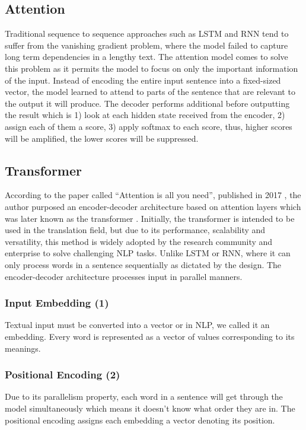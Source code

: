 \documentclass[12pt,oneside,openright,a4paper]{cpe-english-project}
\begin{document}
\subsection{Attention}
Traditional sequence to sequence approaches such as LSTM and RNN tend to suffer from the vanishing gradient problem, where the model failed to capture long term dependencies in a lengthy text. The attention model comes to solve this problem as it permits the model to focus on only the important information of the input\cite{p}. Instead of encoding the entire input sentence into a fixed-sized vector, the model learned to attend to parts of the sentence that are relevant to the output it will produce.  The decoder performs additional before outputting the result which is 1) look at each hidden state received from the encoder, 2) assign each of them a score, 3) apply softmax to each score, thus, higher scores will be amplified, the lower scores will be suppressed.

\subsection{Transformer}
According to the paper called “Attention is all you need”, published in 2017 \cite{p}, the author purposed an encoder-decoder architecture based on attention layers which was later known as the transformer \cite{m}\cite{n}. Initially, the transformer is intended to be used in the translation field, but due to its performance, scalability and versatility, this method is widely adopted by the research community and enterprise to solve challenging NLP tasks. Unlike LSTM or RNN, where it can only process words in a sentence sequentially as dictated by the design. The encoder-decoder architecture processes input in parallel manners. 

\subsubsection{Input Embedding (1)}
Textual input must be converted into a vector or in NLP, we called it an embedding. Every word is represented as a vector of values corresponding to its meanings. 

\subsubsection{Positional Encoding (2)}
Due to its parallelism property, each word in a sentence will get through the model simultaneously which means it doesn't know what order they are in. The positional encoding assigns each embedding a vector denoting its position.
\end{document}
